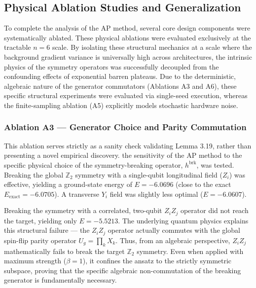 \documentclass[pdflatex,sn-mathphys-num]{sn-jnl}
\theoremstyle{thmstyleone}
\theoremstyle{thmstyletwo}
\theoremstyle{thmstylethree}
\begin{document}
\subsection{Physical Ablation Studies and Generalization}

To complete the analysis of the AP method, several core design components were systematically ablated. These physical ablations were evaluated exclusively at the tractable $n=6$ scale. By isolating these structural mechanics at a scale where the background gradient variance is universally high across architectures, the intrinsic physics of the symmetry operators was successfully decoupled from the confounding effects of exponential barren plateaus. Due to the deterministic, algebraic nature of the generator commutators (Ablations A3 and A6), these specific structural experiments were evaluated via single-seed execution, whereas the finite-sampling ablation (A5) explicitly models stochastic hardware noise.

\subsubsection{Ablation A3 --- Generator Choice and Parity Commutation}
This ablation serves strictly as a sanity check validating Lemma 3.19, rather than presenting a novel empirical discovery. 
the sensitivity of the AP method to the specific physical choice of the symmetry-breaking operator, $h^{\text{brk}}$, was tested. Breaking the global $\mathbb{Z}_2$ symmetry with a single-qubit longitudinal field ($Z_i$) was effective, yielding a ground-state energy of $E = -6.0696$ (close to the exact $E_{\text{exact}} = -6.0705$). A transverse $Y_i$ field was slightly less optimal ($E = -6.0607$).

Breaking the symmetry with a correlated, two-qubit $Z_iZ_j$ operator did not reach the target, yielding only $E = -5.5213$. The underlying quantum physics explains this structural failure --- the $Z_iZ_j$ operator actually commutes with the global spin-flip parity operator $U_g = \prod_k X_k$. Thus, from an algebraic perspective, $Z_iZ_j$ mathematically fails to break the target $\mathbb{Z}_2$ symmetry. Even when applied with maximum strength ($\beta=1$), it confines the ansatz to the strictly symmetric subspace, proving that the specific algebraic non-commutation of the breaking generator is fundamentally necessary.
\end{document}
